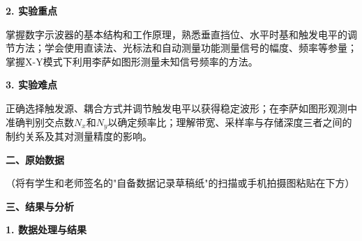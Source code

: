 \documentclass[a4paper,12pt]{article}
\begin{document}
\vspace{0.5cm}

{\fontsize{14pt}{20pt}\selectfont \textbf{2. 实验重点}}

\vspace{0.3cm}

{\fontsize{12pt}{18pt}\selectfont

掌握数字示波器的基本结构和工作原理，熟悉垂直挡位、水平时基和触发电平的调节方法；学会使用直读法、光标法和自动测量功能测量信号的幅度、频率等参量；掌握X-Y模式下利用李萨如图形测量未知信号频率的方法。

}

\vspace{0.5cm}

{\fontsize{14pt}{20pt}\selectfont \textbf{3. 实验难点}}

\vspace{0.3cm}

{\fontsize{12pt}{18pt}\selectfont

正确选择触发源、耦合方式并调节触发电平以获得稳定波形；在李萨如图形观测中准确判别交点数$N_x$和$N_y$以确定频率比；理解带宽、采样率与存储深度三者之间的制约关系及其对测量精度的影响。

}

\newpage

{\fontsize{16pt}{24pt}\selectfont \textbf{二、原始数据}}

\vspace{0.3cm}
{\fontsize{12pt}{18pt}\selectfont （将有学生和老师签名的"自备数据记录草稿纸"的扫描或手机拍摄图粘贴在下方）}

\vspace{0.5cm}

\begin{center}
\end{center}

\newpage

{\fontsize{16pt}{24pt}\selectfont \textbf{三、结果与分析}}

\vspace{0.5cm}

{\fontsize{14pt}{20pt}\selectfont \textbf{1. 数据处理与结果}}

\vspace{0.3cm}
\end{document}
